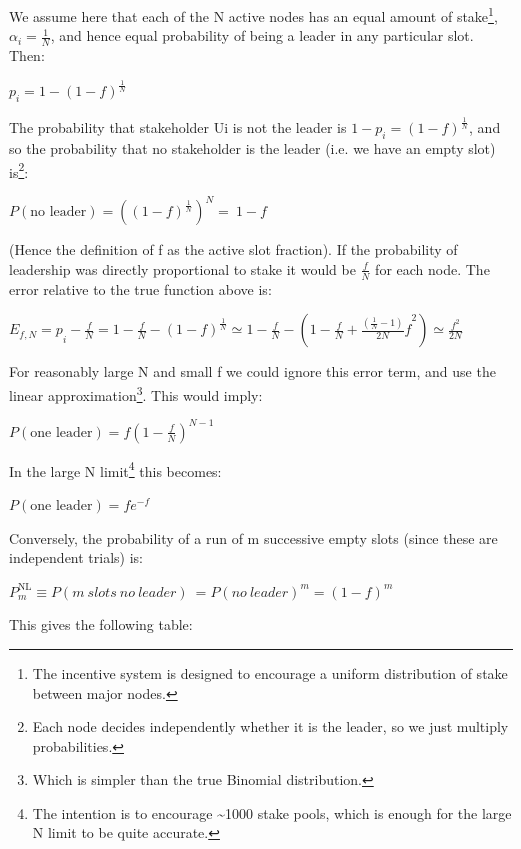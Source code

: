 \documentclass[11pt,a4paper]{article}
\begin{document}
We assume here that each of the N active nodes has an equal amount of
stake\footnote{The incentive system is designed to encourage a uniform
  distribution of stake between major nodes.},
\(\alpha_{i} = \frac{1}{N}\), and hence equal probability of being a
leader in any particular slot. Then:

\(p_{i}{= 1 - \left( 1 - f \right)^{\frac{1}{N}}}_{}\)

The probability that stakeholder Ui is not the leader is
\({1 - p}_{i} = \left( 1 - f \right)^{\frac{1}{N}}\), and so the
probability that no stakeholder is the leader (i.e. we have an empty
slot) is\footnote{Each node decides independently whether it is the
  leader, so we just multiply probabilities.}:

\(P\left( \text{no\ leader} \right) = \left( \left( 1 - f \right)^{\frac{1}{N}} \right)^{N} = \ 1 - f\)

(Hence the definition of f as the active slot fraction). If the
probability of leadership was directly proportional to stake it would be
\(\frac{f}{N}\) for each node. The error relative to the true function
above is:

\({E_{f,N} = p}_{i} - \frac{f}{N} = 1 - \frac{f}{N} - \left( 1 - f \right)^{\frac{1}{N}} \simeq 1 - \frac{f}{N} - \left( 1 - \frac{f}{N} + {\frac{\left( \frac{1}{N} - 1 \right)}{2N}f}^{2} \right) \simeq \frac{f^{2}}{2N}\)

For reasonably large N and small f we could ignore this error term, and
use the linear approximation\footnote{Which is simpler than the true
  Binomial distribution.}. This would imply:

\(P\left( \text{one\ leader} \right) = f\left( 1 - \frac{f}{N} \right)^{N - 1}\)

In the large N limit\footnote{The intention is to encourage
  \textasciitilde{}1000 stake pools, which is enough for the large N
  limit to be quite accurate.} this becomes:

\(P\left( \text{one\ leader} \right) = fe^{- f}\)

Conversely, the probability of a run of m successive empty slots (since
these are independent trials) is:

\(P_{m}^{\text{NL}} \equiv P(m\ slots\ no\ leader)\  = {P(no\ leader)}^{m} = \left( 1 - f \right)^{m}\)

This gives the following table:
\end{document}
